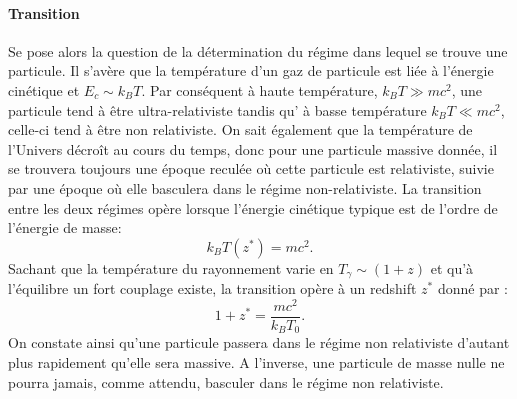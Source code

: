 \paragraph{Transition}
Se pose alors la question de la détermination du régime dans lequel se trouve une particule. Il s'avère que la température d'un gaz de particule est liée à l'énergie cinétique et $E_c\sim k_B T$. Par conséquent à haute température, $k_B T\gg mc^2$, une particule tend à être ultra-relativiste tandis qu' à basse température $k_B T\ll mc^2$, celle-ci tend à être non relativiste. On sait également que la température de l'Univers décroît au cours du temps, donc pour une particule massive donnée, il se trouvera toujours une époque reculée où cette particule est relativiste, suivie par une époque où elle basculera dans le régime non-relativiste. La transition entre les deux régimes opère lorsque l'énergie cinétique typique est de l'ordre de l'énergie de masse:
\begin{equation}
k_B T(z^*)=mc^2.
\end{equation}
Sachant que la température du rayonnement varie en $T_\gamma\sim (1+z)$ et qu'à l'équilibre un fort couplage existe, la transition opère à un redshift $z^*$ donné par :
\begin{equation}
1+z^*=\frac{mc^2}{k_B T_0}.
\end{equation}
 On constate ainsi qu'une particule passera dans le régime non relativiste d'autant plus rapidement qu'elle sera massive. A l'inverse, une particule de masse nulle ne pourra jamais, comme attendu, basculer dans le régime non relativiste.
 

 
